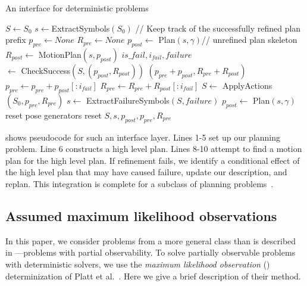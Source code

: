 \begin{algorithm}
 \caption{An interface for deterministic problems} \label{alg-ifop}
 \begin{algorithmic}[1]
  \State $S \leftarrow S_0$
  \State $s \leftarrow $ExtractSymbols$(S_0)$
  \State // Keep track of the successfully refined plan prefix
  \State $p_{pre} \leftarrow None$ 
  \State $R_{pre} \leftarrow None$ 
  \State $p_{post} \leftarrow $ Plan$(s, \gamma)$// unrefined plan skeleton
     \State $R_{post} \leftarrow $ MotionPlan$(s, p_{post})$
     \State $is\_fail, i_{fail}, failure$\\\hspace{50pt}$ \leftarrow $ CheckSuccess$(S, (p_{post}, R_{post}))$
         \State \Return $(p_{pre} + p_{post}, R_{pre} + R_{post})$
     \EndIf
     \State $p_{pre} \leftarrow p_{pre} + p_{post}[:i_{fail}]$
     \State $R_{pre} \leftarrow R_{pre} + R_{post}[:i_{fail}]$
     \State $S \leftarrow $ ApplyActions$(S_0, p_{pre}, R_{pre})$
     \State $s\leftarrow $ ExtractFailureSymbols$(S, failure)$
     \State $p_{post} \leftarrow $ Plan$(s, \gamma)$     
        \State reset pose generators
        \State reset $S, s, p_{post}, p_{pre}, R_{pre}$
     \EndIf
  \EndWhile
  \EndProcedure
 \end{algorithmic}
\end{algorithm}

 shows pseudocode for such an interface layer. Lines
1-5 set up our planning problem. Line 6 constructs a high level
plan. Lines 8-10 attempt to find a motion plan for the high level
plan. If refinement fails, we identify a conditional effect of the
high level plan that may have caused failure, update our description,
and replan.
This integration is complete for a subclass of planning
problems~\cite{srivastava2014combined}.



\subsection{Assumed maximum likelihood observations}
In this paper, we consider problems from a more general class than is
described in ---problems with partial
observability. To solve partially observable problems with
deterministic solvers, we use the \emph{maximum likelihood
  observation} (\mld) determinization of Platt et al.~\cite{platt2010belief}. Here
we give a brief description of their method.

